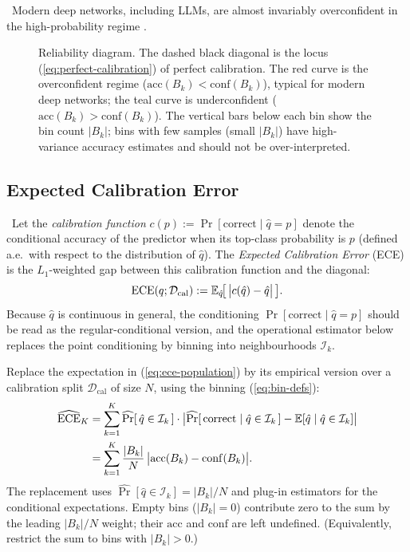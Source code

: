 \Emp\ Modern deep networks, including LLMs, are almost invariably
overconfident in the high-probability regime
\citep{guo2017calibration}.

\begin{figure}[H]
  \centering
  
  \caption{Reliability diagram. The dashed black diagonal is the
           locus (\ref{eq:perfect-calibration}) of perfect calibration.
           The red curve is the overconfident regime
           ($\mathrm{acc}(B_k) < \mathrm{conf}(B_k)$), typical for
           modern deep networks; the teal curve is underconfident
           ($\mathrm{acc}(B_k) > \mathrm{conf}(B_k)$). The vertical
           bars below each bin show the bin count $|B_k|$; bins with
           few samples (small $|B_k|$) have high-variance accuracy
           estimates and should not be over-interpreted.}
  \label{fig:reliability}
\end{figure}

\subsection{Expected Calibration Error}

\Def\ Let the \emph{calibration function} $c(p) := \Pr[\text{correct}
\mid \hat q = p]$ denote the conditional accuracy of the predictor
when its top-class probability is $p$ (defined a.e.\ with respect to
the distribution of $\hat q$). The \emph{Expected Calibration Error}
(ECE) is the $L_1$-weighted gap between this calibration function and
the diagonal:
\begin{equation}
\mathrm{ECE}(q; \mathcal{D}_{\mathrm{cal}})
  := \mathbb{E}_{\hat q}\!\big[\,\big| c(\hat q) - \hat q \big|\,\big].
\label{eq:ece-population}
\end{equation}
Because $\hat q$ is continuous in general, the conditioning
$\Pr[\text{correct} \mid \hat q = p]$ should be read as the
regular-conditional version, and the operational estimator below
replaces the point conditioning by binning into neighbourhoods
$\mathcal{I}_k$.

\begin{derivation}
Replace the expectation in (\ref{eq:ece-population}) by its empirical
version over a calibration split $\mathcal{D}_{\mathrm{cal}}$ of size
$N$, using the binning (\ref{eq:bin-defs}):
\begin{align}
\widehat{\mathrm{ECE}}_{K}
  &= \sum_{k=1}^{K} \widehat{\Pr}[\,\hat q \in \mathcal{I}_k\,]
       \cdot \big| \widehat{\Pr}[\,\text{correct} \mid \hat q \in \mathcal{I}_k\,] - \mathbb{E}[\hat q \mid \hat q \in \mathcal{I}_k] \big| \\
  &= \sum_{k=1}^{K} \frac{|B_k|}{N}\,
       \big| \mathrm{acc}(B_k) - \mathrm{conf}(B_k) \big|.
\label{eq:ece}
\end{align}
The replacement uses $\widehat{\Pr}[\hat q \in \mathcal{I}_k] = |B_k|/N$
and plug-in estimators for the conditional expectations. Empty bins
($|B_k| = 0$) contribute zero to the sum by the leading
$|B_k|/N$ weight; their $\mathrm{acc}$ and $\mathrm{conf}$ are
left undefined. (Equivalently, restrict the sum to bins with
$|B_k| > 0$.)
\end{derivation}

